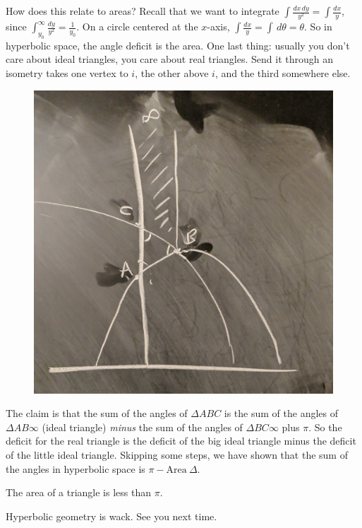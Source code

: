 How does this relate to areas? Recall that we want to integrate $\int \frac{dx\,dy}{y^2} =\int \frac{dx}{y}$, since $\int_{y_0}^{\infty} \frac{dy}{y^2}=\frac{1}{y_0}$. On a circle centered at the $x$-axis, $\int \frac{dx}{y}=\int  \, d\theta=\theta$. So in hyperbolic space, the angle deficit is the area. One last thing: usually you don't care about ideal triangles, you care about real triangles. Send it through an isometry takes one vertex to $i$, the other above $i$, and the third somewhere else.

\begin{figure}[H]
\centering
\includegraphics[width=0.4\linewidth]{figures/rgeo_lec7.2.jpg}
\end{figure}

The claim is that the sum of the angles of $\Delta ABC$ is the sum of the angles of $\Delta AB\infty$ (ideal triangle) \emph{minus} the sum of the angles of $\Delta BC \infty$  plus $\pi$. So the deficit for the real triangle is the deficit of the big ideal triangle minus the deficit of the little ideal triangle. Skipping some steps, we have shown that the sum of the angles in hyperbolic space is $\pi- \text{Area} \ \Delta$.

\begin{cor}
    The area of a triangle is less than $\pi$.
\end{cor}
Hyperbolic geometry is wack. See you next time.

